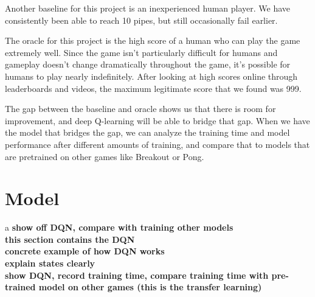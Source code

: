 \documentclass{article}
\begin{document}
Another baseline for this project is an inexperienced human player. 
We have consistently been able to reach 10 pipes, but still occasionally fail earlier.

The oracle for this project is the high score of a human who can play the game extremely well.
Since the game isn't particularly difficult for humans and gameplay doesn't change dramatically throughout the game, it's possible for humans to play nearly indefinitely.
After looking at high scores online through leaderboards and videos, the maximum legitimate score that we found was 999. 

The gap between the baseline and oracle shows us that there is room for improvement, and deep Q-learning will be able to bridge that gap.
When we have the model that bridges the gap, we can analyze the training time and model performance after different amounts of training, and compare that to models that are pretrained on other games like Breakout or Pong.


\section{Model}

a
\textbf{show off DQN, compare with training other models} \\
\textbf{this section contains the DQN} \\
\textbf{concrete example of how DQN works} \\
\textbf{explain states clearly} \\
\textbf{show DQN, record training time, compare training time with pre-trained model on other games (this is the transfer learning)} \\


\end{document}
